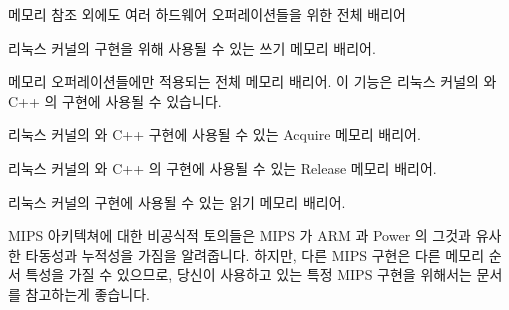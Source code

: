 \begin{description}[style=nextline]
\item[\tco{SYNC}]
	메모리 참조 외에도 여러 하드웨어 오퍼레이션들을 위한 전체 배리어

\item[\tco{SYNC_WMB}]
	리눅스 커널의  구현을 위해 사용될 수 있는 쓰기 메모리
	배리어.

\item[\tco{SYNC_MB}]
	메모리 오퍼레이션들에만 적용되는 전체 메모리 배리어.
	이 기능은 리눅스 커널의  와 C++
	 의 구현에 사용될 수
	있습니다.

\item[\tco{SYNC_ACQUIRE}]
	리눅스 커널의  와 C++
	 구현에 사용될 수
	있는 Acquire 메모리 배리어.

\item[\tco{SYNC_RELEASE}]
	리눅스 커널의  와 C++
	 의 구현에 사용될
	수 있는 Release 메모리 배리어.

\item[\tco{SYNC_RMB}]
	리눅스 커널의  구현에 사용될 수 있는 읽기 메모리 배리어.

\end{description}

MIPS 아키텍쳐에 대한 비공식적 토의들은 MIPS 가 ARM 과 Power 의 그것과 유사한
타동성과 누적성을 가짐을 알려줍니다.
하지만, 다른 MIPS 구현은 다른 메모리 순서 특성을 가질 수 있으므로, 당신이
사용하고 있는 특정 MIPS 구현을 위해서는 문서를 참고하는게 좋습니다.
\iffalse

